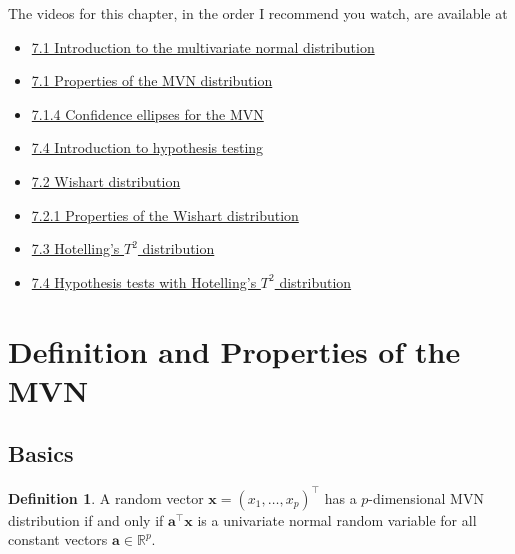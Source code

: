 \documentclass[
]{book}
\providecommand{\tightlist}{%
  \setlength{\itemsep}{0pt}\setlength{\parskip}{0pt}}
\theoremstyle{definition}
\newtheorem{definition}{Definition}[chapter]
\theoremstyle{definition}
\theoremstyle{definition}
\theoremstyle{definition}
\theoremstyle{remark}
\begin{document}
The videos for this chapter, in the order I recommend you watch, are available at

\begin{itemize}
\tightlist
\item
  \href{https://mediaspace.nottingham.ac.uk/media/Multivariate+Normal+Random+VariablesA+Introduction/1_pdjxphay}{7.1 Introduction to the multivariate normal distribution}
\item
  \href{https://mediaspace.nottingham.ac.uk/media/Multivariate+Normal+Random+VariablesA++Properties/1_j9mh4v7r}{7.1 Properties of the MVN distribution}
\item
  \href{https://mediaspace.nottingham.ac.uk/media/Multivariate+Normal+Random+VariablesA++Confidence+Ellipses/1_dlvgqoi3}{7.1.4 Confidence ellipses for the MVN}
\item
  \href{https://mediaspace.nottingham.ac.uk/media/MVN_HypothesistestIntro.mp4/1_b1gstf1h}{7.4 Introduction to hypothesis testing}
\item
  \href{https://mediaspace.nottingham.ac.uk/media/MVN_Wishart/1_3kpedgb6}{7.2 Wishart distribution}
\item
  \href{https://mediaspace.nottingham.ac.uk/media/MVN_WishartProperties/1_yfgzcsyb}{7.2.1 Properties of the Wishart distribution}
\item
  \href{https://mediaspace.nottingham.ac.uk/media/MVN_Hotelling.mp4/1_5evjeyu8}{7.3 Hotelling's \(T^2\) distribution}
\item
  \href{https://mediaspace.nottingham.ac.uk/media/Multivariate+NormalsA+Hypothesis+testing/1_bhk20k5z}{7.4 Hypothesis tests with Hotelling's \(T^2\) distribution}
\end{itemize}

\section{Definition and Properties of the MVN}\label{definition-and-properties-of-the-mvn}

\subsection{Basics}\label{basics}

\begin{definition}
\protect\hypertarget{def:mvn}{}\label{def:mvn}A random vector \(\mathbf x=(x_1, \ldots , x_p)^\top\) has a \(p\)-dimensional MVN distribution if and only if \(\mathbf a^\top \mathbf x\) is a univariate normal random variable for all constant vectors \(\mathbf a\in \mathbb{R}^p\).
\end{definition}
\end{document}
